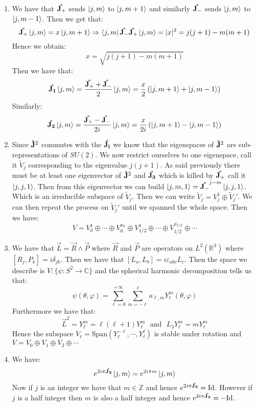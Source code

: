 \documentclass[10pt,a4paper]{book}
\begin{document}
\begin{enumerate}
\item We have that $\vu{J_+}$ sends $\ket{j, m}$ to $\ket{j, m+1}$ and similarly $\vu{J_-}$ sends $\ket{j, m}$ to $\ket{j, m - 1}$. Then we get that:
\[
\vu{J_+} \ket{j, m} = x \ket{j, m + 1} \Rightarrow \bra{j, m} \vu{J_-} \vu{J_+} \ket{j, m} = |x|^2 = j(j+1) - m(m+1)
\]
Hence we obtain:
\[
x = \sqrt{j(j+1) - m(m+1)}
\]
Then we have that:
\[
\vu{J_1} \ket{j, m} = \frac{\vu{J_+} + \vu{J_-}}{2} \ket{j, m} = \frac{x}{2} \left( \ket{j, m+1} + \ket{j, m-1} \right)
\]
Similarly:
\[
\vu{J_2} \ket{j, m} = \frac{\vu{J_+} - \vu{J_-}}{2i} \ket{j, m} = \frac{x}{2i} \left( \ket{j, m+1} - \ket{j, m-1} \right)
\]

\item Since $\vu{J}^2$ commutes with the $\vu{J_i}$ we know that the eigenspaces of $\vu{J}^2$ are sub-representations of $SU(2)$. We now restrict ourselves to one eigenspace, call it $\tilde{V}_j$ corresponding to the eigenvalue $j(j+1)$. As said previously there must be at least one eigenvector of $\vu{J}^2$ and $\vu{J_3}$ which is killed by $\vu{J_+}$ call it $\ket{j, j, 1}$. Then from this eigenvector we can build $\ket{j, m, 1} = \vu{J_-}^{j - m} \ket{j, j, 1}$. Which is an irreducible subspace of $\tilde{V}_j$. Then we can write $\tilde{V}_j = V_j^1 \oplus \tilde{V}_j'$. We can then repeat the process on $\tilde{V}_j'$ until we spanned the whole space. Then we have:
\[
V = V_0^1 \oplus \cdots \oplus V^{n_0}_0 \oplus V_{1/2}^1 \oplus \cdots \oplus V_{1/2}^{n_{1/2}} \oplus \cdots 
\]

\item We have that $\vec{L} = \vec{R} \land \vec{P}$ where $\vec{R}$ and $\vec{P}$ are operators on $L^2(\mathbb{R}^3)$ where $[R_j, P_k] = i \delta_{jk}$. Then we have that $[L_a, L_b] = i\varepsilon_{a b c} L_c$. Then the space we describe is $V : \{ \psi : S^2 \to \mathbb{C}\}$ and the spherical harmonic decomposition tells us that:
\[
\psi(\theta, \varphi) = \sum_{\ell = 0}^{+\infty}\sum_{m = -\ell}^\ell a_{\ell,m} Y_\ell^m(\theta, \varphi)
\]
Furthermore we have that:
\[
\vec{L}^2 = Y_\ell^m = \ell(\ell+1) Y_{\ell}^m \mbox{~~and~~} L_3 Y_\ell^m = m Y_\ell^m
\]
Hence the subspace $V_\ell = \text{Span}(Y_\ell^{-\ell}, \cdots, Y_\ell^\ell)$ is stable under rotation and $V = V_0 \oplus V_1 \oplus V_2 \oplus \cdots $

\item We have:
\[
e^{2i\pi \vu{J_3}} \ket{j, m} = e^{2 i \pi m} \ket{j, m}
\]
Now if $j$ is an integer we have that $m \in \mathbb{Z}$ and hence $e^{2 i \pi \vu{J_3}} = \text{Id}$. However if $j$ is a half integer then $m$ is also a half integer and hence $e^{2 i \pi \vu{J_3}} = -\text{Id}$.


\end{enumerate}
\end{document}
